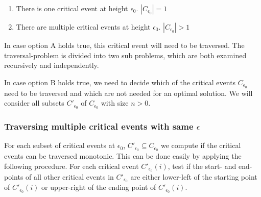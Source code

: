 \begin{enumerate}[label=(\Alph*)]
	\item There is one critical event at height $\epsilon_0$. $|C_{\epsilon_0}| = 1$
	\item There are multiple critical events at height $\epsilon_0$. $|C_{\epsilon_0}| > 1$
\end{enumerate}

In case option A holds true, this critical event will need to be traversed. The traversal-problem is divided into two sub problems, which are both examined recursively and independently.

In case option B holds true, we need to decide which of the critical events $C_{\epsilon_0}$ need to be traversed and which are not needed for an optimal solution. We will consider all subsets $C'_{\epsilon_0}$ of $C_{\epsilon_0}$ with size $n>0$.

\subsubsection{Traversing multiple critical events with same $\epsilon$}

For each subset of critical events at $\epsilon_0$, $C'_{\epsilon_0} \subseteq C_{\epsilon_0}$ we compute if the critical events can be traversed monotonic. This can be done easily by applying the following procedure. For each critical event $C'_{\epsilon_0}(i)$, test if the start- and end-points of all other critical events in $C'_{\epsilon_0}$ are either lower-left of the starting point of $C'_{\epsilon_0}(i)$ or upper-right of the ending point of $C'_{\epsilon_0}(i)$.

